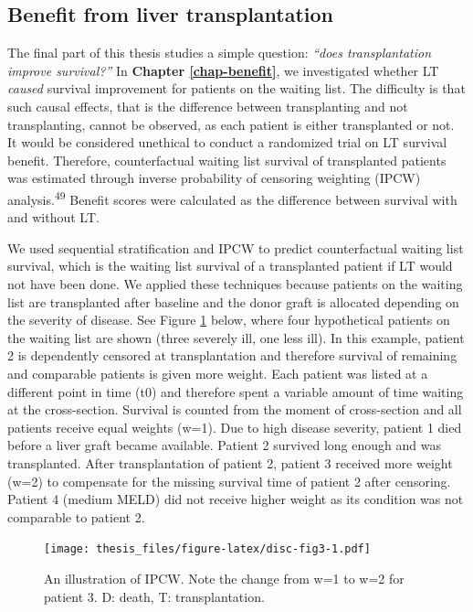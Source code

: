 \documentclass[11pt,english,]{book} %
\begin{document}
\hypertarget{benefit-from-liver-transplantation}{%
\subsection*{Benefit from liver transplantation}\label{benefit-from-liver-transplantation}}

The final part of this thesis studies a simple question: \emph{``does transplantation improve survival?''} In \textbf{Chapter \ref{chap-benefit}}, we investigated whether LT \emph{caused} survival improvement for patients on the waiting list. The difficulty is that such causal effects, that is the difference between transplanting and not transplanting, cannot be observed, as each patient is either transplanted or not. It would be considered unethical to conduct a randomized trial on LT survival benefit. Therefore, counterfactual waiting list survival of transplanted patients was estimated through inverse probability of censoring weighting (IPCW) analysis.\textsuperscript{49} Benefit scores were calculated as the difference between survival with and without LT.

We used sequential stratification and IPCW to predict counterfactual waiting list survival, which is the waiting list survival of a transplanted patient if LT would not have been done. We applied these techniques because patients on the waiting list are transplanted after baseline and the donor graft is allocated depending on the severity of disease. See Figure \ref{fig:disc-fig3} below, where four hypothetical patients on the waiting list are shown (three severely ill, one less ill). In this example, patient 2 is dependently censored at transplantation and therefore survival of remaining and comparable patients is given more weight. Each patient was listed at a different point in time (t0) and therefore spent a variable amount of time waiting at the cross-section. Survival is counted from the moment of cross-section and all patients receive equal weights (w=1). Due to high disease severity, patient 1 died before a liver graft became available. Patient 2 survived long enough and was transplanted. After transplantation of patient 2, patient 3 received more weight (w=2) to compensate for the missing survival time of patient 2 after censoring. Patient 4 (medium MELD) did not receive higher weight as its condition was not comparable to patient 2.

\begin{figure}
\centering
\texttt{[image: thesis\_files/figure-latex/disc-fig3-1.pdf]}
\caption{\label{fig:disc-fig3}An illustration of IPCW. Note the change from w=1 to w=2 for patient 3. D: death, T: transplantation.}
\end{figure}
\end{document}
